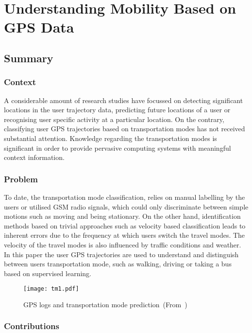 \newpage
\section{Understanding Mobility Based on GPS Data~\cite{Zheng:2008:UMB:1409635.1409677}} \label{lect1}

\subsection{Summary} \label{lect1-sum}

\subsubsection{Context}

A considerable amount of research studies have focussed on detecting significant locations
in the user trajectory data, predicting future locations of a user or recognising user specific 
activity at a particular location. On the contrary, classifying user GPS trajectories 
based on transportation modes has not received substantial attention. Knowledge regarding 
the transportation modes is significant in order to provide pervasive computing systems with
meaningful context information. 

\subsubsection{Problem}

To date, the transportation mode classification, relies on manual labelling by the users or  
utilised GSM radio signals, which could only discriminate between simple motions such as moving
and being stationary. On the other hand, identification methods based on trivial approaches such
as velocity based classification leads to inherent errors due to the frequency at which users 
switch the travel modes. The velocity of the travel modes is also influenced by traffic conditions 
and weather. In this paper the user GPS trajectories are used to understand and 
distinguish between users transportation mode, such as walking, driving or taking a bus based on 
supervised learning.  

\begin{figure}[h]
\centering
\texttt{[image: tm1.pdf]}
\caption{GPS logs and transportation mode prediction~(From~\cite{Zheng:2008:UMB:1409635.1409677})}
\end{figure}

\subsubsection{Contributions}

